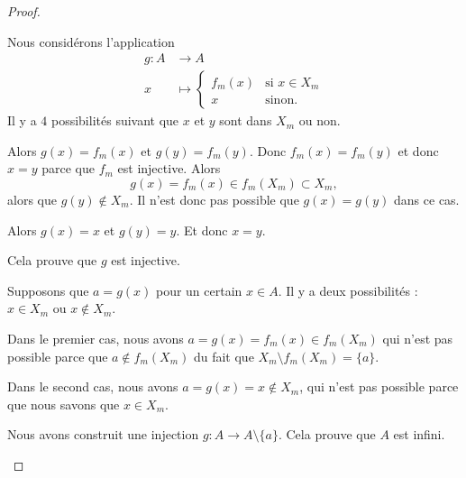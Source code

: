 \begin{proof}
\begin{subproof}
		\spitem[L'application \( g\)]
		Nous considérons l'application
		\begin{equation}
			\begin{aligned}
				g\colon A & \to A                                 \\
				x         & \mapsto \begin{cases}
					                    f_m(x) & \text{si }  x\in X_m \\
					                    x      & \text{sinon. }
				                    \end{cases}
			\end{aligned}
		\end{equation}
		Il y a \( 4\) possibilités suivant que \( x\) et \( y\) sont dans \( X_m\) ou non.
		\begin{subproof}
			\spitem[Si \( x,y\in X_m\)]
			Alors \( g(x)=f_m(x)\) et \( g(y)=f_m(y)\). Donc \( f_m(x)=f_m(y)\) et donc \( x=y\) parce que \( f_m\) est injective.
			\spitem[Si \( x\in X_m\) et \( y\not\in X_m\)]
			Alors
			\begin{equation}
				g(x)=f_m(x)\in f_m(X_m)\subset X_m,
			\end{equation}
			alors que \( g(y)\not\in X_m\). Il n'est donc pas possible que \( g(x)=g(y)\) dans ce cas.

			\spitem[Si \( x,y\not\in X_m\)]
			Alors \( g(x)=x\) et \( g(y)=y\). Et donc \( x=y\).
		\end{subproof}
		Cela prouve que \( g\) est injective.

		\spitem[\( a\not\in g(A)\)]
		Supposons que \( a=g(x)\) pour un certain \( x\in A\). Il y a deux possibilités : \( x\in X_m\) ou \( x\not\in X_m\).

		Dans le premier cas, nous avons \(a= g(x)=f_m(x)\in f_m(X_m)\) qui n'est pas possible parce que \( a\not\in f_m(X_m)\) du fait que \( X_m\setminus f_m(X_m)=\{ a \}\).

		Dans le second cas, nous avons \( a=g(x)=x\not\in X_m\), qui n'est pas possible parce que nous savons que \( x\in X_m\).

		\spitem[Conclusion]
		Nous avons construit une injection \(g \colon A\to A\setminus \{ a \}  \). Cela prouve que \( A\) est infini.
	\end{subproof}
\end{proof}



